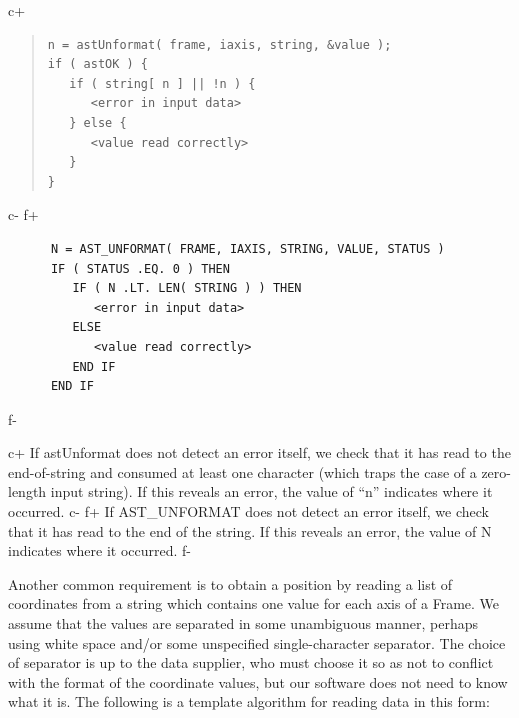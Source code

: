 \documentclass[twoside,11pt]{article}
\begin{document}
c+
\begin{quote}
\small
\begin{verbatim}
n = astUnformat( frame, iaxis, string, &value );
if ( astOK ) {
   if ( string[ n ] || !n ) {
      <error in input data>
   } else {
      <value read correctly>
   }
}
\end{verbatim}
\normalsize
\end{quote}
c-
f+
\small
\begin{verbatim}
      N = AST_UNFORMAT( FRAME, IAXIS, STRING, VALUE, STATUS )
      IF ( STATUS .EQ. 0 ) THEN
         IF ( N .LT. LEN( STRING ) ) THEN
            <error in input data>
         ELSE
            <value read correctly>
         END IF
      END IF
\end{verbatim}
\normalsize
f-

c+
If astUnformat does not detect an error itself, we check that it has
read to the end-of-string and consumed at least one character (which
traps the case of a zero-length input string). If this reveals an
error, the value of ``n'' indicates where it occurred.
c-
f+
If AST\_UNFORMAT does not detect an error itself, we check that it has
read to the end of the string. If this reveals an error, the value of
N indicates where it occurred.
f-

Another common requirement is to obtain a position by reading a list
of coordinates from a string which contains one value for each axis of
a Frame. We assume that the values are separated in some unambiguous
manner, perhaps using white space and/or some unspecified
single-character separator. The choice of separator is up to the data
supplier, who must choose it so as not to conflict with the format of
the coordinate values, but our software does not need to know what it
is. The following is a template algorithm for reading data in this
form:
\end{document}
